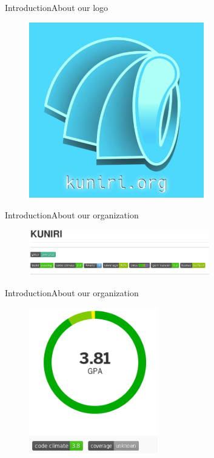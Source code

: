 \documentclass[10pt]{beamer}
\begin{document}
\begin{frame}{Introduction}{About our logo}
  \begin{figure}[overview]
    \includegraphics[width=0.68\textwidth]{images/2.jpg}
  \end{figure}
\end{frame}

\begin{frame}{Introduction}{About our organization}
  \begin{figure}[overview]
    \includegraphics[width=0.7\textwidth]{images/github.png}
  \end{figure}
\end{frame}

\begin{frame}{Introduction}{About our organization}
  \begin{figure}[overview]
    \includegraphics[width=0.5\textwidth]{images/codeclimate.png}
  \end{figure}
\end{frame}
\end{document}
